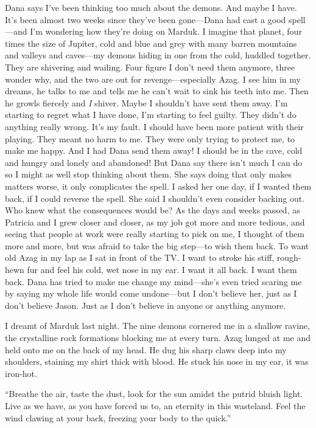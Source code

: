 Dana says I've been thinking too much about the demons. And maybe I
have. It's been almost two weeks since they've been gone---Dana had cast
a good spell---and I'm wondering how they're doing on Marduk. I imagine
that planet, four times the size of Jupiter, cold and blue and grey with
many barren mountains and valleys and caves---my demons hiding in one
from the cold, huddled together. They are shivering and wailing. Four
figure I don't need them anymore, three wonder why, and the two are out
for revenge---especially Azag. I see him in my dreams, he talks to me
and tells me he can't wait to sink his teeth into me. Then he growls
fiercely and \emph{I} shiver. Maybe I shouldn't have sent them away. I'm
starting to regret what I have done, I'm starting to feel guilty. They
didn't do anything really wrong. It's my fault. I should have been more
patient with their playing. They meant no harm to me. They were only
trying to protect me, to make me happy. And I had Dana send them away! I
should be in the cave, cold and hungry and lonely and abandoned! But
Dana say there isn't much I can do so I might as well stop thinking
about them. She says doing that only makes matters worse, it only
complicates the spell. I asked her one day, if I wanted them back, if I
could reverse the spell. She said I shouldn't even consider backing out.
Who knew what the consequences would be? As the days and weeks passed,
as Patricia and I grew closer and closer, as my job got more and more
tedious, and seeing that people at work were really starting to pick on
me, I thought of them more and more, but was afraid to take the big
step---to wish them back. To want old Azag in my lap as I sat in front
of the TV. I want to stroke his stiff, rough-hewn fur and feel his cold,
wet nose in my ear. I want it all back. I want them back. Dana has tried
to make me change my mind---she's even tried scaring me by saying my
whole life would come undone---but I don't believe her, just as I don't
believe Jason. Just as I don't believe in anyone or anything anymore.

I dreamt of Marduk last night. The nine demons cornered me in a shallow
ravine, the crystalline rock formations blocking me at every turn. Azag
lunged at me and held onto me on the back of my head. He dug his sharp
claws deep into my shoulders, staining my shirt thick with blood. He
stuck his nose in my ear, it was iron-hot.

``Breathe the air, taste the dust, look for the sun amidst the putrid
bluish light. Live as we have, as you have forced us to, an eternity in
this wasteland. Feel the wind clawing at your back, freezing your body
to the quick.''

